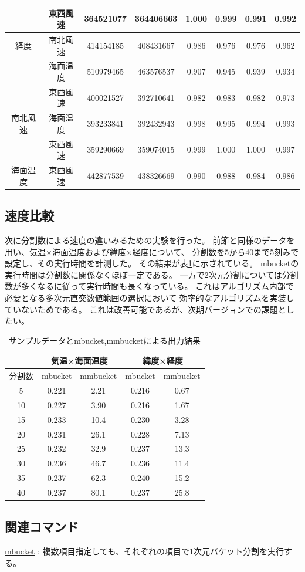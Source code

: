 \begin{table}[hbt]
\begin{center}
{\begin{tabular}{c|c||c|c|c|c|c|c}
            & 東西風速 &364521077 &364406663 &1.000 &0.999 &0.991 &0.992 \\ \hline
経度        & 南北風速 &414154185 &408431667 &0.986 &0.976 &0.976 &0.962 \\
            & 海面温度 &510979465 &463576537 &0.907 &0.945 &0.939 &0.934 \\
            & 東西風速 &400021527 &392710641 &0.982 &0.983 &0.982 &0.973 \\ \hline
南北風速    & 海面温度 &393233841 &392432943 &0.998 &0.995 &0.994 &0.993 \\
            & 東西風速 &359290669 &359074015 &0.999 &1.000 &1.000 &0.997 \\ \hline
海面温度    & 東西風速 &442877539 &438326669 &0.990 &0.988 &0.984 &0.986 \\ \hline
\end{tabular}
}
\end{center}
\end{table}
 
\subsection*{速度比較}

次に分割数による速度の違いみるための実験を行った。
前節と同様のデータを用い、気温×海面温度および緯度×経度について、
分割数を5から40まで5刻みで設定し、その実行時間を計測した。
その結果が表\ref{tbl:mmbucket_table2}に示されている。
mbucketの実行時間は分割数に関係なくほぼ一定である。
一方で2次元分割については分割数が多くなるに従って実行時間も長くなっている。
これはアルゴリズム内部で必要となる多次元直交数値範囲の選択において
効率的なアルゴリズムを実装していないためである。
これは改善可能であるが、次期バージョンでの課題としたい。


\begin{table}[hbt]
\begin{center}
\caption{サンプルデータとmbucket,mmbucketによる出力結果 \label{tbl:mmbucket_table2}}
{\footnotesize
\begin{tabular}{c|c|c|c|c}
\hline
& \multicolumn{2}{|c|}{気温×海面温度} & \multicolumn{2}{|c}{緯度×経度} \\ \hline
分割数 &mbucket &mmbucket &mbucket &mmbucket\\ \hline
5 &0.221 &2.21 &0.216 &0.67\\
10 &0.227 &3.90 &0.216 &1.67\\
15 &0.233 &10.4 &0.230 &3.28\\
20 &0.231 &26.1 &0.228 &7.13\\
25 &0.232 &32.9 &0.237 &13.3\\
30 &0.236 &46.7 &0.236 &11.4\\
35 &0.237 &62.3 &0.240 &15.2\\
40 &0.237 &80.1 &0.237 &25.8\\ \hline
\end{tabular}
}
\end{center}
\end{table}

\subsection*{関連コマンド}
\hyperref[sect:mbucket]{mbucket} : 複数項目指定しても、それぞれの項目で1次元バケット分割を実行する。

%

